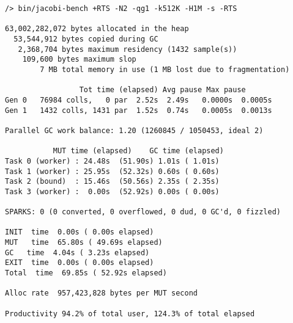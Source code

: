 \documentclass{tmr}
\begin{document}
\begin{lstlisting}[float,captionpos=b,belowcaptionskip=4pt, caption=Haskell test run 3]
/> bin/jacobi-bench +RTS -N2 -qg1 -k512K -H1M -s -RTS

63,002,282,072 bytes allocated in the heap
  53,544,912 bytes copied during GC
   2,368,704 bytes maximum residency (1432 sample(s))
    109,600 bytes maximum slop
        7 MB total memory in use (1 MB lost due to fragmentation)

                 Tot time (elapsed) Avg pause Max pause
Gen 0   76984 colls,   0 par  2.52s  2.49s   0.0000s  0.0005s
Gen 1   1432 colls, 1431 par  1.52s  0.74s   0.0005s  0.0013s

Parallel GC work balance: 1.20 (1260845 / 1050453, ideal 2)

           MUT time (elapsed)    GC time (elapsed)
Task 0 (worker) : 24.48s  (51.90s) 1.01s ( 1.01s)
Task 1 (worker) : 25.95s  (52.32s) 0.60s ( 0.60s)
Task 2 (bound)  : 15.46s  (50.56s) 2.35s ( 2.35s)
Task 3 (worker) :  0.00s  (52.92s) 0.00s ( 0.00s)

SPARKS: 0 (0 converted, 0 overflowed, 0 dud, 0 GC'd, 0 fizzled)

INIT  time  0.00s ( 0.00s elapsed)
MUT   time  65.80s ( 49.69s elapsed)
GC   time  4.04s ( 3.23s elapsed)
EXIT  time  0.00s ( 0.00s elapsed)
Total  time  69.85s ( 52.92s elapsed)

Alloc rate  957,423,828 bytes per MUT second

Productivity 94.2% of total user, 124.3% of total elapsed

\end{lstlisting}
\end{document}
